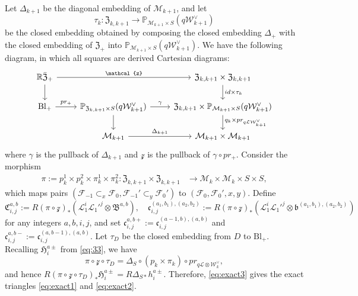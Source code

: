 \documentclass{amsart}
\numberwithin{equation}{section}
\newcommand\mc{\mathcal}
\newcommand\mf{\mathfrak}
\newcommand\mb{\mathbb}
\newcommand{\Bl}{\mathrm{Bl}}
\theoremstyle{definition}
\theoremstyle{remark}
\begin{document}
Let $\Delta_{k+1}$ be the diagonal embedding of $\mc{M}_{k+1}$, and let
$$\tau_{k}:\mf{Z}_{k,k+1}\to \mb{P}_{\mc{M}_{k+1}\times S}(q\mc{W}_{k+1}^{\vee})$$
be the closed embedding obtained by composing the closed embedding $\Delta_{+}$ with the closed embedding of $\mf{Z}_+$ into $\mb{P}_{\mc{M}_{k+1}\times S}(q\mc{W}_{k+1}^{\vee})$. We have the following diagram, in which all squares are derived Cartesian diagrams:
\begin{equation}
  \label{cref418}
  \begin{tikzcd}
 \mb{R}\bar{\mf{Z}}_{+} \ar{d} \ar{rr}{\mc{z}}&       & \mf{Z}_{k,k+1}\times \mf{Z}_{k,k+1} \ar{d}{id\times \tau_{k}} \\
\Bl_{+} \ar{r}{pr_{+}} & \mb{P}_{\mf{Z}_{k,k+1}\times S}(q\mc{W}_{k+1}^{\vee}) \ar{r}{\gamma}\ar{d} & \mf{Z}_{k,k+1}\times \mb{P}_{\mc{M}_{k+1}\times S}(q\mc{W}_{k+1}^{\vee})\ar{d}{q_k\times pr_{q\mc{L}\mc{W}_{k+1}^{\vee}}} \\
& \mc{M}_{k+1}\ar{r}{\Delta_{k+1}} & \mc{M}_{k+1}\times \mc{M}_{k+1}
  \end{tikzcd}
\end{equation}
where $\gamma$ is the pullback of $\Delta_{k+1}$ and $\mc{z}$ is the pullback of $\gamma \circ pr_{+}$. Consider the morphism
\begin{align*}
  \pi:=p_{k}^{1}\times p_{k}^{2}\times \pi_{k}^{1}\times \pi_{k}^{2}:\mf{Z}_{k,k+1}\times \mf{Z}_{k,k+1}&\to \mc{M}_{k}\times \mc{M}_{k}\times S\times S,
\end{align*}
which maps pairs $(\mc{F}_{-1}\subset_{x} \mc{F}_{0}, \mc{F}_{-1}'\subset_{y} \mc{F}_{0}')$ to $(\mc{F}_{0},\mc{F}_{0}',x,y)$. Define
$$\mf{C}_{i,j}^{a,b}:=R(\pi\circ \mc{z})_{*}(\mc{L}_1^i\mc{L}_1'^j\otimes \mf{B}^{a,b}), \quad \mf{c}_{i,j}^{(a_{1},b_{1}),(a_{2},b_{2})}:=R(\pi\circ \mc{z})_{*}(\mc{L}_1^i\mc{L}_1'^j\otimes \mf{b}^{(a_{1},b_{1}),(a_{2},b_{2})})$$
for any integers $a,b,i,j$, and set $\mf{c}_{i,j}^{a,b+}:=\mf{c}_{i,j}^{(a-1,b),(a,b)}$ and $\mf{c}_{i,j}^{a,b-}:=\mf{c}_{i,j}^{(a,b-1),(a,b)}$.
Let $\tau_{D}$ be the closed embedding from $D$ to $\Bl_{+}$. Recalling $\mf{H}_{i}^{a\pm}$ from \cref{eq:33}, we have
$$\pi\circ \mc{z}\circ \tau_{D}=\Delta_{S} \circ (p_{k}\times \pi_{k})\circ pr_{q\mc{L}\otimes \mc{W}_{k}^{\vee}},$$
and hence $R(\pi\circ \mc{z}\circ \tau_{D})_{*}\mf{H}_{i}^{a\pm}=R\Delta_{S*}h_{i}^{a\pm}.$ Therefore, \cref{eq:exact3} gives the exact triangles \cref{eq:exact1} and \cref{eq:exact2}.
\end{document}
